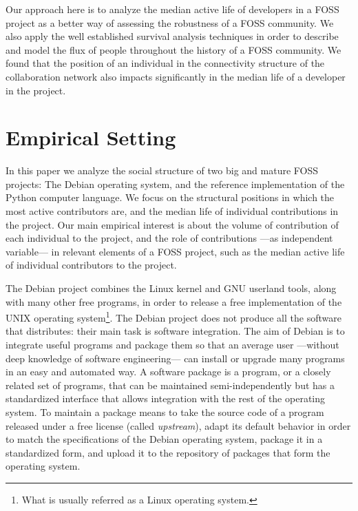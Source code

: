 Our approach here is to analyze the median active life of developers in a FOSS project as a better way of assessing the robustness of a FOSS community. We also apply the well established survival analysis techniques \citep{miller:2011} in order to describe and model the flux of people throughout the history of a FOSS community.  We found that the position of an individual in the connectivity structure of the collaboration network also impacts significantly in the median life of a developer in the project.

\section{Empirical Setting}

In this paper we analyze the social structure of two big and mature FOSS projects: The Debian operating system, and the reference implementation of the Python computer language. We focus on the structural positions in which the most active contributors are, and the median life of individual contributions in the project. Our main empirical interest is about the volume of contribution of each individual to the project, and the role of contributions ---as independent variable--- in relevant elements of a FOSS project, such as the median active life of individual contributors to the project.

The Debian project combines the Linux kernel and GNU userland tools, along with many other free programs, in order to release a free implementation of the UNIX operating system\footnote{What is usually referred as a Linux operating system.}. The Debian project does not produce all the software that distributes: their main task is software integration. The aim of Debian is to integrate useful programs and package them so that an average user ---without deep knowledge of software engineering--- can install or upgrade many programs in an easy and automated way. A software package is a program, or a closely related set of programs, that can be maintained semi-independently but has a standardized interface that allows integration with the rest of the operating system. To maintain a package means to take the source code of a program released under a free license (called \emph{upstream}), adapt its default behavior in order to match the specifications of the Debian operating system, package it in a standardized form, and upload it to the repository of packages that form the operating system.

